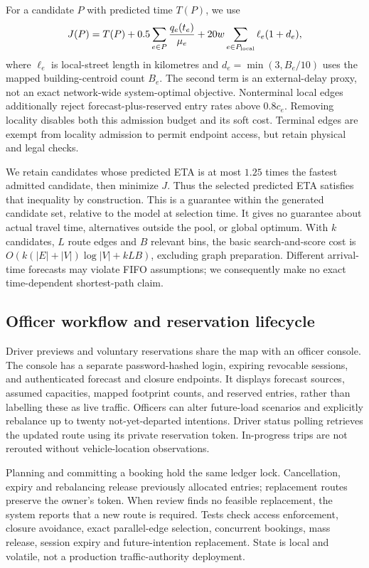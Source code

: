 \documentclass[sigconf,anonymous,review]{acmart}
\begin{document}
For a candidate $P$ with predicted time $T(P)$, we use
\begin{equation}
 J(P)=T(P)+0.5\sum_{e\in P}\frac{q_e(t_e)}{\mu_e}
       +20w\sum_{e\in P_{\rm local}}\ell_e(1+d_e),
\end{equation}
where $\ell_e$ is local-street length in kilometres and $d_e=\min(3,B_e/10)$ uses the mapped building-centroid count $B_e$. The second term is an external-delay proxy, not an exact network-wide system-optimal objective. Nonterminal local edges additionally reject forecast-plus-reserved entry rates above $0.8c_e$. Removing locality disables both this admission budget and its soft cost. Terminal edges are exempt from locality admission to permit endpoint access, but retain physical and legal checks.

We retain candidates whose predicted ETA is at most $1.25$ times the fastest admitted candidate, then minimize $J$. Thus the selected predicted ETA satisfies that inequality by construction. This is a guarantee within the generated candidate set, relative to the model at selection time. It gives no guarantee about actual travel time, alternatives outside the pool, or global optimum. With $k$ candidates, $L$ route edges and $B$ relevant bins, the basic search-and-score cost is $O(k(|E|+|V|)\log|V|+kLB)$, excluding graph preparation. Different arrival-time forecasts may violate FIFO assumptions; we consequently make no exact time-dependent shortest-path claim.

\subsection{Officer workflow and reservation lifecycle}
Driver previews and voluntary reservations share the map with an officer console. The console has a separate password-hashed login, expiring revocable sessions, and authenticated forecast and closure endpoints. It displays forecast sources, assumed capacities, mapped footprint counts, and reserved entries, rather than labelling these as live traffic. Officers can alter future-load scenarios and explicitly rebalance up to twenty not-yet-departed intentions. Driver status polling retrieves the updated route using its private reservation token. In-progress trips are not rerouted without vehicle-location observations.

Planning and committing a booking hold the same ledger lock. Cancellation, expiry and rebalancing release previously allocated entries; replacement routes preserve the owner's token. When review finds no feasible replacement, the system reports that a new route is required. Tests check access enforcement, closure avoidance, exact parallel-edge selection, concurrent bookings, mass release, session expiry and future-intention replacement. State is local and volatile, not a production traffic-authority deployment.
\end{document}
